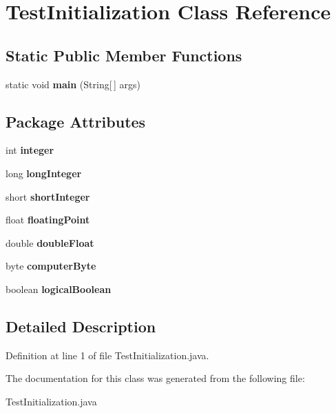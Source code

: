 \section{Test\-Initialization Class Reference}
\label{classTestInitialization}
\subsection*{Static Public Member Functions}
\begin{CompactItemize}
\item 
static void {\bf main} (String[$\,$] args)\label{classTestInitialization_277750cb06d23c95b7a98042fc91b83f}

\end{CompactItemize}
\subsection*{Package Attributes}
\begin{CompactItemize}
\item 
int {\bf integer}\label{classTestInitialization_7c0f384a95434a2657b144d6a917f64e}

\item 
long {\bf long\-Integer}\label{classTestInitialization_1c6a08a09f341cd1547f24222a2f1fd0}

\item 
short {\bf short\-Integer}\label{classTestInitialization_1c49d8a99d70d7c1e3b5aa1b8d16cc15}

\item 
float {\bf floating\-Point}\label{classTestInitialization_54951d7830a3095d855d92b2459bdcba}

\item 
double {\bf double\-Float}\label{classTestInitialization_b518ed3f8a9019bc418a777bc7ea3db3}

\item 
byte {\bf computer\-Byte}\label{classTestInitialization_7defe88a692e91023b563688d0827c23}

\item 
boolean {\bf logical\-Boolean}\label{classTestInitialization_e97465bf9fe6fcc343e18937e4c7d31f}

\end{CompactItemize}


\subsection{Detailed Description}




Definition at line 1 of file Test\-Initialization.java.

The documentation for this class was generated from the following file:\begin{CompactItemize}
\item 
Test\-Initialization.java\end{CompactItemize}

